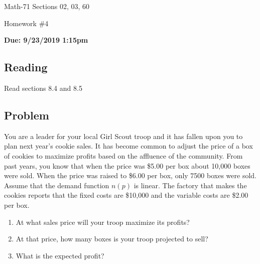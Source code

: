 \documentclass[letterpaper,12pt,fleqn]{article}
\begin{document}
\begin{center}
  \large
  Math-71 Sections 02, 03, 60

  \Large
  Homework \#4

  \large
  \textbf{Due: 9/23/2019 1:15pm}
\end{center}

\subsection*{Reading}

Read sections 8.4 and 8.5

\subsection*{Problem}

You are a leader for your local Girl Scout troop and it has fallen upon you to plan next year's cookie sales.  It
has become common to adjust the price of a box of cookies to maximize profits based on the affluence of the
community.  From past years, you know that when the price was \$5.00 per box about 10,000 boxes were sold.  When
the price was raised to \$6.00 per box, only 7500 boxes were sold.  Assume that the demand function \(n(p)\) is
linear.  The factory that makes the cookies reports that the fixed costs are \$10,000 and the variable costs are
\$2.00 per box.
\begin{enumerate}
\item At what sales price will your troop maximize its profits?
\item At that price, how many boxes is your troop projected to sell?
\item What is the expected profit?
\end{enumerate}
\end{document}
